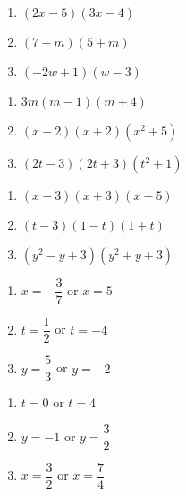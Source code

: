 \documentclass[11pt]{article}
\theoremstyle{definition}  %
\newcounter{HW}
\begin{document}
\begin{multicols}{3}
\begin{enumerate}
\setcounter{enumi}{\value{HW}}

\item $(2x-5)(3x-4)$
\item $(7-m)(5+m)$
\item $(-2w+1)(w-3)$



\setcounter{HW}{\value{enumi}}
\end{enumerate}
\end{multicols}


\begin{multicols}{3}
\begin{enumerate}
\setcounter{enumi}{\value{HW}}

\item $3m(m-1)(m+4)$
\item $(x-2)(x+2)(x^2+5)$
\item $(2t-3)(2t+3)(t^2+1)$


\setcounter{HW}{\value{enumi}}
\end{enumerate}
\end{multicols}

\begin{multicols}{3}
\begin{enumerate}
\setcounter{enumi}{\value{HW}}

\item $(x-3)(x+3)(x-5)$
\item $(t-3)(1-t)(1+t)$
\item $(y^2-y+3)(y^2+y+3)$


\setcounter{HW}{\value{enumi}}
\end{enumerate}
\end{multicols}



\begin{multicols}{3}
\begin{enumerate}
\setcounter{enumi}{\value{HW}}

\item   $x = -\dfrac{3}{7}$ or $x = 5$ 
\item   $t = \dfrac{1}{2}$ or $t = -4$
\item   $y = \dfrac{5}{3}$ or $y = -2$

\setcounter{HW}{\value{enumi}}
\end{enumerate}
\end{multicols}


\begin{multicols}{3}
\begin{enumerate}
\setcounter{enumi}{\value{HW}}

\item   $t = 0$ or $t = 4$
\item   $y = -1$ or $y = \dfrac{3}{2}$ 
\item   $x = \dfrac{3}{2}$ or $x = \dfrac{7}{4}$ 

\setcounter{HW}{\value{enumi}}
\end{enumerate}
\end{multicols}
\end{document}
